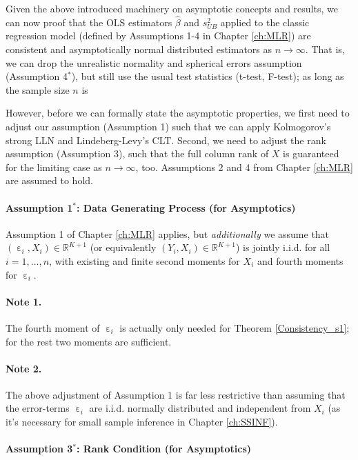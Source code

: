 \documentclass[
  14pt,
]{memoir}
\DeclareMathOperator{\eps}{\varepsilon}
\begin{document}
Given the above introduced machinery on asymptotic concepts and results, we can now proof that the OLS estimators \(\hat\beta\) and \(s_{UB}^2\) applied to the classic regression model (defined by Assumptions 1-4 in Chapter \ref{ch:MLR}) are consistent and asymptotically normal distributed estimators as \(n\to\infty\). That is, we can drop the unrealistic normality and spherical errors assumption (Assumption 4\(^\ast\)), but still use the usual test statistics (t-test, F-test); as long as the sample size \(n\) is 

However, before we can formally state the asymptotic properties, we first need to adjust our  assumption (Assumption 1) such that we can apply Kolmogorov's strong LLN and Lindeberg-Levy's CLT. Second, we need to adjust the rank assumption (Assumption 3), such that the full column rank of \(X\) is guaranteed for the limiting case as \(n\to\infty\), too. Assumptions 2 and 4 from Chapter \ref{ch:MLR} are assumed to hold.

\paragraph*{Assumption 1$^\ast$: Data Generating Process (for Asymptotics)}

Assumption 1 of Chapter \ref{ch:MLR} applies, but \emph{additionally} we assume that \((\eps_i, X_i)\in\mathbb{R}^{K+1}\) (or equivalently \((Y_i,X_i)\in\mathbb{R}^{K+1}\)) is jointly i.i.d. for all \(i=1,\dots,n\), with existing and finite second moments for \(X_i\) and fourth moments for \(\eps_i\).

\paragraph*{Note 1.}

The fourth moment of \(\eps_i\) is actually only needed for Theorem \ref{Consistency_s1}; for the rest two moments are sufficient.

\paragraph*{Note 2.}

The above adjustment of Assumption 1 is far less restrictive than assuming that the error-terms \(\eps_i\) are i.i.d. normally distributed and independent from \(X_i\) (as it's necessary for small sample inference in Chapter \ref{ch:SSINF}).

\paragraph*{Assumption 3$^\ast$: Rank Condition (for Asymptotics)}
\end{document}
